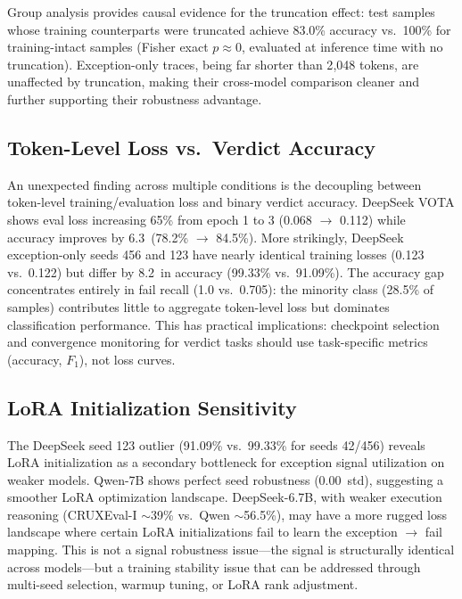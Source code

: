 \documentclass[11pt]{article}
\newcommand{\pp}{\,\text{pp}}
\begin{document}
Group analysis provides causal evidence for the truncation effect: test samples whose training counterparts were truncated achieve 83.0\% accuracy vs.\ 100\% for training-intact samples (Fisher exact $p \approx 0$, evaluated at inference time with no truncation).
Exception-only traces, being far shorter than 2{,}048 tokens, are unaffected by truncation, making their cross-model comparison cleaner and further supporting their robustness advantage.

\subsection{Token-Level Loss vs.\ Verdict Accuracy}
\label{sec:loss_decoupling}

An unexpected finding across multiple conditions is the decoupling between token-level training/evaluation loss and binary verdict accuracy.
DeepSeek VOTA shows eval loss increasing 65\% from epoch 1 to 3 (0.068 $\rightarrow$ 0.112) while accuracy improves by 6.3\pp{} (78.2\% $\rightarrow$ 84.5\%).
More strikingly, DeepSeek exception-only seeds 456 and 123 have nearly identical training losses (0.123 vs.\ 0.122) but differ by 8.2\pp{} in accuracy (99.33\% vs.\ 91.09\%).
The accuracy gap concentrates entirely in fail recall (1.0 vs.\ 0.705): the minority class (28.5\% of samples) contributes little to aggregate token-level loss but dominates classification performance.
This has practical implications: checkpoint selection and convergence monitoring for verdict tasks should use task-specific metrics (accuracy, $F_1$), not loss curves.

\subsection{LoRA Initialization Sensitivity}
\label{sec:lora_sensitivity}

The DeepSeek seed 123 outlier (91.09\% vs.\ 99.33\% for seeds 42/456) reveals LoRA initialization as a secondary bottleneck for exception signal utilization on weaker models.
Qwen-7B shows perfect seed robustness (0.00\pp{} std), suggesting a smoother LoRA optimization landscape.
DeepSeek-6.7B, with weaker execution reasoning (CRUXEval-I ${\sim}$39\% vs.\ Qwen ${\sim}$56.5\%), may have a more rugged loss landscape where certain LoRA initializations fail to learn the exception $\rightarrow$ fail mapping.
This is not a signal robustness issue---the signal is structurally identical across models---but a training stability issue that can be addressed through multi-seed selection, warmup tuning, or LoRA rank adjustment.
\end{document}
